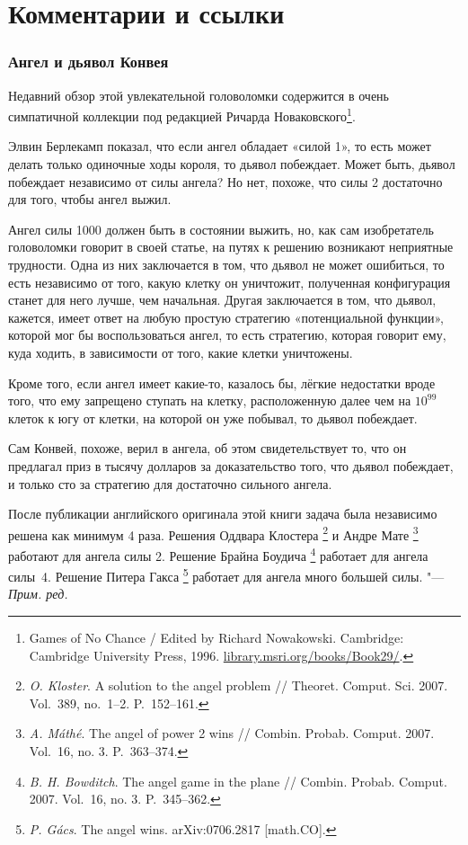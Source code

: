 \documentclass[twoside]{book}
\newenvironment{addedbytheeditors}{\par\medskip\small
}{\par\addvspace{\medskipamount}} %
\begin{document}
\section*{Комментарии и ссылки}

\subsubsection*{Ангел и дьявол Конвея}

Недавний обзор этой увлекательной головоломки содержится в очень симпатичной коллекции под редакцией Ричарда Новаковского\footnote{{Games of No Chance} / Edited by Richard Nowakowski. Cambridge: Cambridge Uni\-ver\-sity Press, 1996. \href{http://library.msri.org/books/Book29/}{\url{library.msri.org/books/Book29/}}.}. 

Элвин Берлекамп показал, что если ангел обладает «силой 1»,
то есть может делать только одиночные ходы короля, то дьявол побеждает.
Может быть, дьявол побеждает независимо от силы ангела?  Но нет,
похоже, что силы 2 достаточно для того, чтобы ангел выжил.

Ангел силы 1000 должен быть в состоянии выжить, но, как сам
изобретатель головоломки говорит в своей статье, на путях к решению
возникают неприятные трудности.
Одна из них заключается в том, что
дьявол не может ошибиться, то есть независимо от того, какую клетку он
уничтожит, полученная конфигурация станет для него лучше, чем
начальная.
Другая заключается в том, что дьявол, кажется, имеет ответ
на любую простую стратегию «потенциальной функции», которой мог бы
воспользоваться ангел, то есть стратегию, которая говорит ему, куда
ходить, в зависимости от того, какие клетки уничтожены.

Кроме того, если ангел имеет какие-то, казалось бы, лёгкие недостатки
вроде того, что ему запрещено ступать на клетку, расположенную далее
чем на $10^{99}$ клеток к югу от клетки, на которой он уже побывал, то
дьявол побеждает.

Сам Конвей, похоже, верил в ангела, об этом свидетельствует то, что он
предлагал приз в тысячу долларов за доказательство того, что дьявол
побеждает, и только сто за стратегию для достаточно сильного ангела.

\begin{addedbytheeditors}
После публикации английского оригинала этой книги задача была независимо решена как минимум 4 раза.
Решения Оддвара Клостера%
\footnote{
\emph{O. Kloster}. 
A solution to the angel problem /\!/
{Theoret. Comput. Sci.} 2007.  Vol.~389, no.~1--2. P.~152--161.}
и Андре Мате%
\footnote{
\emph{A. Máthé}. 
The angel of power 2 wins /\!/ 
{Combin. Probab. Comput.} 2007. Vol.~16, no. 3. P.~363–374.}
работают для ангела силы 2.
Решение Брайна Боудича%
\footnote{\emph{B. H. Bowditch}.
  The angel game in the plane /\!/ {Combin. Probab. Comput.} 2007. Vol.~16, no. 3. P.~345--362.}
работает для ангела силы~4.
Решение Питера Гакса%
\footnote{\emph{P. G\'{a}cs}. {The angel wins.} arXiv:0706.2817 [math.CO].}
работает для ангела много большей силы. "--- \emph{Прим. ред.}
\end{addedbytheeditors}
\end{document}
